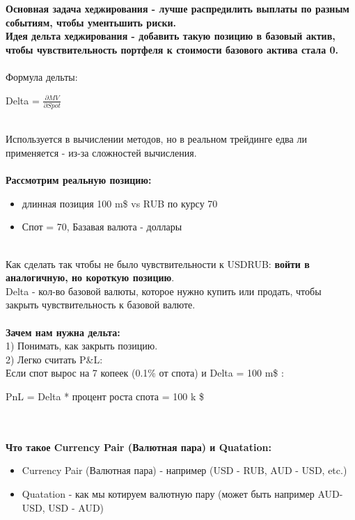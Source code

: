 \documentclass{article}
\begin{document}
\textbf{Основная задача хеджирования - лучше распредилить выплаты по разным событиям, чтобы ументьшить риски. \\
Идея дельта хеджирования - добавить такую позицию в базовый актив, чтобы чувствительность портфеля к стоимости базового актива стала 0.}
\\\\
Формула дельты: \\
\begin{center} 
Delta = $\frac{\partial MV}{\partial Spot}$ 
\end{center}
\\
Используется в вычислении методов, но в реальном трейдинге едва ли применяется - из-за сложностей вычисления.
\\\\
\textbf{Рассмотрим реальную позицию:} 
\begin{itemize} 
\item{длинная позиция 100 m\$ vs  RUB по курсу 70}
\item{Спот = 70, Базавая валюта - доллары} 
\end{itemize}
\\
Как сделать так чтобы не было чувствительности к USDRUB: \textbf{войти в аналогичную, но короткую позицию}. \\
Delta - кол-во базовой валюты, которое нужно купить или продать, чтобы закрыть чувствительность к базовой валюте. \\\\
\textbf{Зачем нам нужна дельта:} \\
1) Понимать, как закрыть позицию. \\
2) Легко считать P&L: \\
Если спот вырос на 7 копеек (0.1\% от спота) и Delta = 100 m\$ : \\
\begin{center} 
PnL = Delta * процент роста спота = 100 k \$ 
\end{center} 
\\\\
\textbf{Что такое Currency Pair (Валютная пара) и Quatation:}
\begin{itemize}
\item{Currency Pair (Валютная пара)  - например (USD - RUB, AUD - USD, etc.)}
\item{Quatation - как мы котируем валютную пару (может быть например AUD- USD, USD - AUD)} 
\end{itemize}

\end{document}
